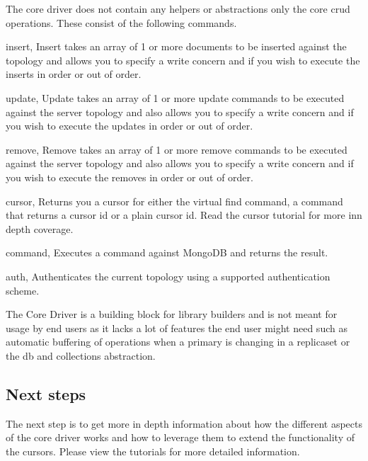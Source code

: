 The core driver does not contain any helpers or abstractions only the core crud operations. These consist of the following commands.


\begin{DoxyItemize}
\item {\ttfamily insert}, Insert takes an array of 1 or more documents to be inserted against the topology and allows you to specify a write concern and if you wish to execute the inserts in order or out of order.
\item {\ttfamily update}, Update takes an array of 1 or more update commands to be executed against the server topology and also allows you to specify a write concern and if you wish to execute the updates in order or out of order.
\item {\ttfamily remove}, Remove takes an array of 1 or more remove commands to be executed against the server topology and also allows you to specify a write concern and if you wish to execute the removes in order or out of order.
\item {\ttfamily cursor}, Returns you a cursor for either the \textquotesingle{}virtual\textquotesingle{} {\ttfamily find} command, a command that returns a cursor id or a plain cursor id. Read the cursor tutorial for more inn depth coverage.
\item {\ttfamily command}, Executes a command against Mongo\+DB and returns the result.
\item {\ttfamily auth}, Authenticates the current topology using a supported authentication scheme.
\end{DoxyItemize}

The Core Driver is a building block for library builders and is not meant for usage by end users as it lacks a lot of features the end user might need such as automatic buffering of operations when a primary is changing in a replicaset or the db and collections abstraction.

\subsection*{Next steps}

The next step is to get more in depth information about how the different aspects of the core driver works and how to leverage them to extend the functionality of the cursors. Please view the tutorials for more detailed information. 